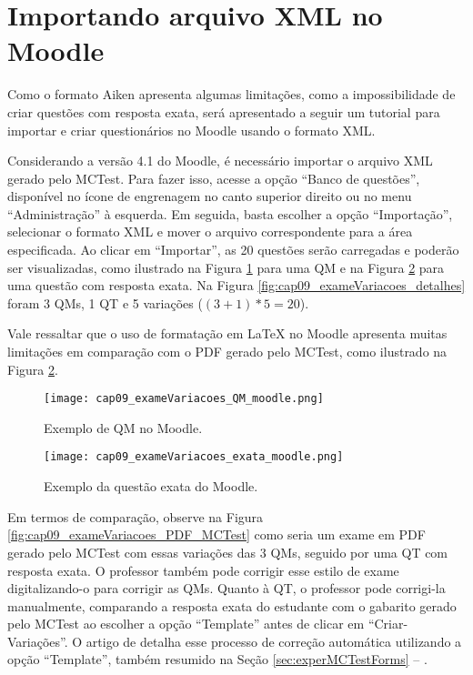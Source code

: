 \section{Importando arquivo XML no Moodle}

Como o formato Aiken apresenta algumas limitações, como a impossibilidade de criar questões com resposta exata, será apresentado a seguir um tutorial para importar e criar questionários no Moodle usando o formato XML.

Considerando a versão 4.1 do Moodle, é necessário importar o arquivo XML gerado pelo MCTest. Para fazer isso, acesse a opção ``Banco de questões'', disponível no ícone de engrenagem no canto superior direito ou no menu ``Administração'' à esquerda. Em seguida, basta escolher a opção ``Importação'', selecionar o formato XML e mover o arquivo correspondente para a área especificada. Ao clicar em ``Importar'', as 20 questões serão carregadas e poderão ser visualizadas, como ilustrado na Figura \ref{fig:cap09_exameVariacoes_QM_moodle} para uma QM e na Figura \ref{fig:cap09_exameVariacoes_exata_moodle} para uma questão com resposta exata. Na Figura \ref{fig:cap09_exameVariacoes_detalhes} foram 3 QMs, 1 QT e 5 variações ($(3+1)*5=20$).

Vale ressaltar que o uso de formatação em \LaTeX{} no Moodle apresenta muitas limitações em comparação com o PDF gerado pelo MCTest, como ilustrado na Figura \ref{fig:cap09_exameVariacoes_exata_moodle}.

\begin{figure}[!ht]
\centering
  \texttt{[image: cap09\_exameVariacoes\_QM\_moodle.png]}
    \caption{Exemplo de QM no Moodle.}
  \label{fig:cap09_exameVariacoes_QM_moodle}
\end{figure}

\begin{figure}
\centering
  \texttt{[image: cap09\_exameVariacoes\_exata\_moodle.png]}
  \caption{Exemplo da questão exata do Moodle.}
  \label{fig:cap09_exameVariacoes_exata_moodle}
\end{figure}

Em termos de comparação, observe na Figura \ref{fig:cap09_exameVariacoes_PDF_MCTest} como seria um exame em PDF gerado pelo MCTest com essas variações das 3 QMs, seguido por uma QT com resposta exata. O professor também pode corrigir esse estilo de exame digitalizando-o para corrigir as QMs. Quanto à QT, o professor pode corrigi-la manualmente, comparando a resposta exata do estudante com o gabarito gerado pelo MCTest ao escolher a opção ``Template'' antes de clicar em ``Criar-Variações''. O artigo de  detalha esse processo de correção automática utilizando a opção ``Template'', também resumido na Seção \ref{sec:experMCTestForms} -- .



